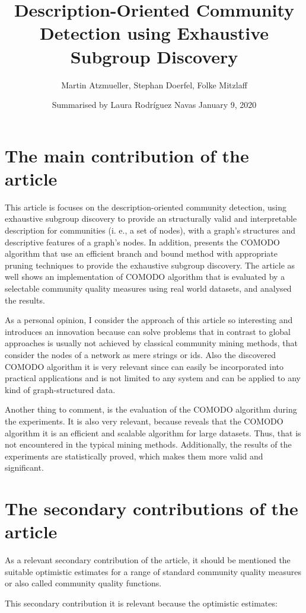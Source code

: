 \documentclass[a4paper]{article}
\title{Description-Oriented Community Detection using Exhaustive Subgroup Discovery}
\date{Summarised by Laura Rodríguez Navas \vskip 0.35cm January 9, 2020}
\author{Martin Atzmueller, Stephan Doerfel, Folke Mitzlaff}
\begin{document}
	
\maketitle

\section*{The main contribution of the article}
This article is focuses on the description-oriented community detection, using exhaustive subgroup discovery to provide an structurally valid and interpretable description for communities (i. e., a set of nodes), with a graph's structures and descriptive features of a graph’s nodes. In addition, presents the COMODO algorithm that use an efficient branch and bound method with appropriate pruning techniques to provide the exhaustive subgroup discovery. The article as well shows an implementation of COMODO algorithm that is evaluated by a selectable community quality measures using real world datasets, and analysed the results.

As a personal opinion, I consider the approach of this article so interesting and introduces an innovation because can solve problems that in contrast to global approaches is usually not achieved by classical community mining methods, that consider the nodes of a network as mere strings or ids. Also the discovered COMODO algorithm it is very relevant since can easily be incorporated into practical applications and is not limited to any system and can be applied to any kind of graph-structured data.

Another thing to comment, is the evaluation of the COMODO algorithm during the experiments. It is also very relevant, because reveals that the COMODO algorithm it is an efficient and scalable algorithm for large datasets. Thus, that is not encountered in the typical mining methods. Additionally, the results of the experiments are statistically proved, which makes them more valid and significant.

\section*{The secondary contributions of the article}
As a relevant secondary contribution of the article, it should be mentioned the suitable optimistic estimates for a range of standard community quality measures or also called community quality functions.

This secondary contribution it is relevant because the optimistic estimates:
\end{document}

